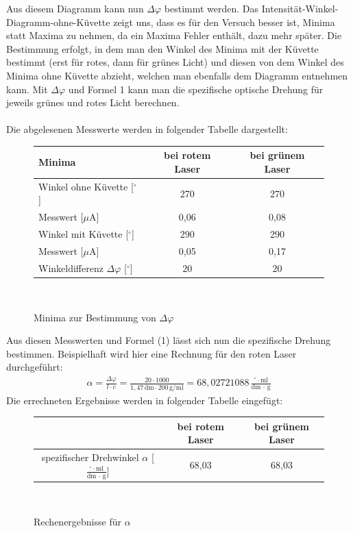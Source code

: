 \documentclass[fontsize=12pt]{scrartcl}
\begin{document}
\noindent
Aus diesem Diagramm kann nun $\Delta\varphi$ bestimmt werden. Das Intensität-Winkel-Diagramm-ohne-Küvette zeigt uns, dass es für den Versuch besser 
ist, Minima statt Maxima zu nehmen, da ein Maxima Fehler enthält, dazu mehr später. Die Bestimmung erfolgt, in dem man den Winkel des Minima mit der 
Küvette bestimmt (erst für rotes, dann für grünes Licht) und diesen von dem Winkel des Minima ohne Küvette abzieht, welchen man ebenfalls dem Diagramm 
entnehmen kann. 
Mit $\Delta\varphi$ und Formel 1 kann man die spezifische optische Drehung für jeweils grünes und rotes Licht berechnen. \\
~\\
Die abgelesenen Messwerte werden in folgender Tabelle dargestellt:
\begin{figure}[h]
\centering
\caption{Minima zur Bestimmung von $\Delta\varphi$}
\begin{tabular}{|l|c|c|} \hline
Minima  & bei rotem Laser  & bei grünem Laser\\ \hline
Winkel ohne Küvette [$^\circ$]  & 270  & 270 \\ \hline
Messwert [$\mu$A]& 0,06 & 0,08  \\ \hline
Winkel mit Küvette [$^\circ$] & 290  & 290 \\ \hline
Messwert [$\mu$A] & 0,05  & 0,17  \\ \hline 
Winkeldifferenz $\Delta\varphi$ [$^\circ$]& 20 & 20 \\ \hline 
\end{tabular} \\
\end{figure}
\noindent
Aus diesen Messwerten und Formel (1) lässt sich nun die spezifische Drehung bestimmen. Beispielhaft wird hier eine Rechnung für den roten Laser durchgeführt:
\begin{align*}
\alpha = \frac{\Delta\varphi}{l \cdot c} = \frac{ 20 \cdot 1000}{1,47\,\text{dm} \cdot 200\,\text{g/ml}} =  68,02721088\,\frac{ ^\circ \cdot \text{ml}}{\text{dm $\cdot$ g}}
\end{align*}
Die errechneten Ergebnisse werden in folgender Tabelle eingefügt:
\begin{figure}[h]
\centering
\caption{Rechenergebnisse für $\alpha$}
\begin{tabular}{|c|c|c|} \hline
  & bei rotem Laser  & bei grünem Laser\\ \hline
spezifischer Drehwinkel $\alpha$ [$\frac{ ^\circ \cdot \text{ml}}{\text{dm $\cdot$ g}}$]  & 68,03  & 68,03  \\ \hline
\end{tabular} \\
\end{figure}
\end{document}
